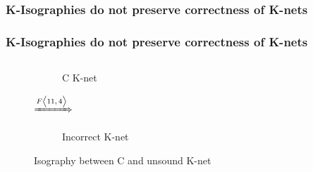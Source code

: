 \documentclass{beamer}
\begin{document}
\subsubsection{K-Isographies do not preserve correctness of K-nets}
\begin{frame}[fragile]
	\frametitle{K-Isographies do not preserve correctness of K-nets}
	\begin{columns}


		\begin{column}{0.4\textwidth}
			\begin{figure}[t]

				\begin{subfigure}{.46\textwidth}
					\centering
					\caption{C K-net}
					\label{fig:KCmajor}
				\end{subfigure}%
				{\Large$\xRightarrow{\text%
						{\scriptsize $F\big< 11,4 \big>$}}$}%
				\begin{subfigure}{.50\textwidth}
					\centering

					\caption{Incorrect K-net}
					\label{fig:KAminor}
				\end{subfigure}
				\caption{Isography between C and unsound K-net}
				\label{fig:Kisography}
			\end{figure}
		\end{column}
		\hspace{1cm}
		\begin{column}{0.6\textwidth}


\end{column}
\end{columns}
\end{frame}
\end{document}
